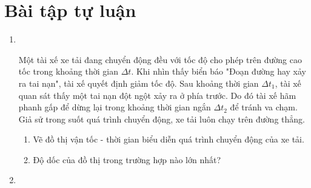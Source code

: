 \section{Bài tập tự luận}
\begin{enumerate}[label=\bfseries Bài \arabic*:]
	\item {}\\
	{Một tài xế xe tải đang chuyển động đều với tốc độ cho phép trên đường cao tốc trong khoảng thời gian $\Delta t$. Khi nhìn thấy biển báo "Đoạn đường hay xảy ra tai nạn", tài xế quyết định giảm tốc độ. Sau khoảng thời gian $\Delta t_1$, tài xế quan sát thấy một tai nạn đột ngột xảy ra ở phía trước. Do đó tài xế hãm phanh gấp để dừng lại trong khoảng thời gian ngắn $\Delta t_2$ để tránh va chạm. Giả sử trong suốt quá trình chuyển động, xe tải luôn chạy trên đường thẳng.
		\begin{enumerate}[label=\alph*)]
			\item Vẽ đồ thị vận tốc - thời gian biểu diễn quá trình chuyển động của xe tải.
			\item Độ dốc của đồ thị trong trường hợp nào lớn nhất?
		\end{enumerate}
}
	
	\item {}
	

\end{enumerate}
